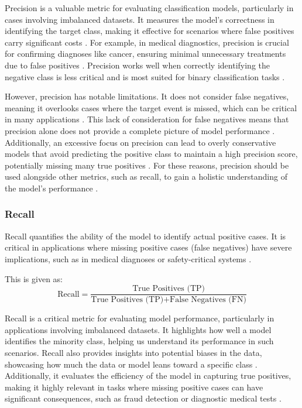 Precision is a valuable metric for evaluating classification models, particularly in cases involving imbalanced datasets. It measures the model's correctness in identifying the target class, making it effective for scenarios where false positives carry significant costs \cite{evidentlyai_accuracy_precision_recall}. For example, in medical diagnostics, precision is crucial for confirming diagnoses like cancer, ensuring minimal unnecessary treatments due to false positives \cite{appliedai_evaluation_metrics}. Precision works well when correctly identifying the negative class is less critical and is most suited for binary classification tasks \cite{bose_classification_metrics}.

However, precision has notable limitations. It does not consider false negatives, meaning it overlooks cases where the target event is missed, which can be critical in many applications \cite{evidentlyai_accuracy_precision_recall,pareto_precision_recall}. This lack of consideration for false negatives means that precision alone does not provide a complete picture of model performance . Additionally, an excessive focus on precision can lead to overly conservative models that avoid predicting the positive class to maintain a high precision score, potentially missing many true positives
. For these reasons, precision should be used alongside other metrics, such as recall, to gain a holistic understanding of the model’s performance \cite{pareto_precision_recall}.

\subsubsection{Recall}
Recall quantifies the ability of the model to identify actual positive cases. It is critical in applications where missing positive cases (false negatives) have severe implications, such as in medical diagnoses or safety-critical systems \cite{article}.

This is given as: 
\begin{equation}
    \text{Recall} = \frac{\text{True Positives (TP)}}{\text{True Positives (TP)} + \text{False Negatives (FN)}}
\end{equation}

Recall is a critical metric for evaluating model performance, particularly in applications involving imbalanced datasets. It highlights how well a model identifies the minority class, helping us understand its performance in such scenarios. Recall also provides insights into potential biases in the data, showcasing how much the data or model leans toward a specific class \cite{bose_classification_metrics}. Additionally, it evaluates the efficiency of the model in capturing true positives, making it highly relevant in tasks where missing positive cases can have significant consequences, such as fraud detection or diagnostic medical tests \cite{appliedai_evaluation_metrics,evidentlyai_accuracy_precision_recall}.

